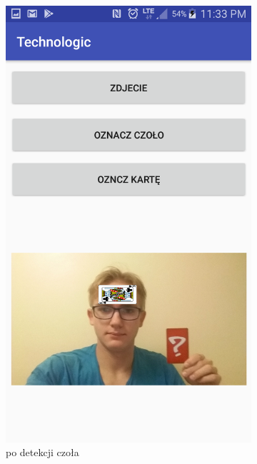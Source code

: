 \documentclass{article}
\numberwithin{equation}{section}
\begin{document}
\begin{figure}[H]
\begin{subfigure}{0.25\textwidth}
        \includegraphics[width=\linewidth]{czolo.png}
        \caption{po detekcji czoła}
        \label{fig:zdjecieCzolo}
    \end{subfigure}\hfill
    \begin{subfigure}{0.25\textwidth}
        \centering

\end{subfigure}
\end{figure}
\end{document}
